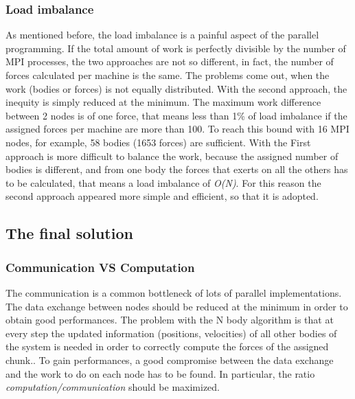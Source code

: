 \documentclass[a4paper]{article}
\begin{document}
\subsubsection{Load imbalance}
\label{sec:b_rep}
As mentioned before, the load imbalance is a painful aspect of the parallel programming. If the total amount of work is perfectly divisible by the number of MPI processes, the two approaches are not so different, in fact, the number of forces calculated per machine is the same. The problems come out, when the work (bodies or forces) is not equally distributed. With the second approach, the inequity is simply reduced at the minimum. The maximum work difference between 2 nodes is of one force, that means less than 1\% of load imbalance if the assigned forces per machine are more than 100. To reach this bound with 16 MPI nodes, for example, 58 bodies (1653 forces) are sufficient. With the First approach is more difficult to balance the work, because the assigned number of bodies is different, and from one body the forces that exerts on all the others has to be calculated, that means a load imbalance of \textit{O(N)}. For this reason the second approach appeared more simple and efficient, so that it is adopted.


\subsection{The final solution}
\label{sec:final_sol}

\subsubsection{Communication VS Computation}
\label{sec:comm_comp}
The communication is a common bottleneck of lots of parallel implementations. The data exchange between nodes should be reduced at the minimum in order to obtain good performances. The problem with the N body algorithm is that at every step the updated information (positions, velocities) of all other bodies of the system is needed in order to correctly compute the forces of the assigned chunk.. To gain performances, a good compromise between the data exchange and the work to do on each node has to be found. In particular, the ratio \textit{computation/communication} should be maximized. 
\end{document}
